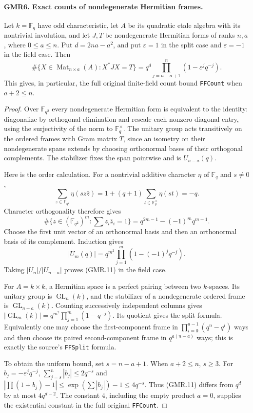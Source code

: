 \documentclass[11pt,a4paper]{article}
\numberwithin{equation}{section}
\theoremstyle{remark}\newtheorem{remark}[theorem]{Remark}
\begin{document}
\paragraph{GMR6. Exact counts of nondegenerate Hermitian frames.}
\label{claim:GMR6}
Let $k=\mathbb F_q$ have odd characteristic, let $A$ be its quadratic
etale algebra with its nontrivial involution, and let $J,T$ be
nondegenerate Hermitian forms of ranks $n,a$, where $0\leq a\leq n$.
Put $d=2na-a^2$, and put $\varepsilon=1$ in the split case and
$\varepsilon=-1$ in the field case.  Then
\[
 \#\{X\in\operatorname{Mat}_{n\times a}(A):X^*JX=T\}
  =q^d\prod_{j=n-a+1}^{n}(1-\varepsilon^j q^{-j}).
 \tag{GMR.11}
\]
This gives, in particular, the full original finite-field count bound
\texttt{FFCount} when $a+2\leq n$.

\begin{proof}
Over $\mathbb F_{q^2}$ every nondegenerate Hermitian form is equivalent
to the identity: diagonalize by orthogonal elimination and rescale
each nonzero diagonal entry, using the surjectivity of the norm to
$\mathbb F_q^\times$.  The unitary group acts transitively on the
ordered frames with Gram matrix $T$, since an isometry on their
nondegenerate spans extends by choosing orthonormal bases of their
orthogonal complements.  The stabilizer fixes the span pointwise and
is $U_{n-a}(q)$.

Here is the order calculation.  For a nontrivial additive character
$\eta$ of $\mathbb F_q$ and $s\ne0$,
\[
 \sum_{z\in\mathbb F_{q^2}}\eta(s z\bar z)
   =1+(q+1)\sum_{t\in\mathbb F_q^\times}\eta(st)=-q.
\]
Character orthogonality therefore gives
\[
 \#\{z\in(\mathbb F_{q^2})^m:\textstyle\sum z_i\bar z_i=1\}
  =q^{2m-1}-(-1)^m q^{m-1}.
\]
Choose the first unit vector of an orthonormal basis and then an
orthonormal basis of its complement.  Induction gives
\[
 |U_m(q)|=q^{m^2}\prod_{j=1}^{m}(1-(-1)^j q^{-j}).
 \tag{GMR.12}
\]
Taking $|U_n|/|U_{n-a}|$ proves (GMR.11) in the field case.

For $A=k\times k$, a Hermitian space is a perfect pairing between two
$k$-spaces.  Its unitary group is $\operatorname{GL}_n(k)$, and the
stabilizer of a nondegenerate ordered frame is
$\operatorname{GL}_{n-a}(k)$.  Counting successively independent
columns gives $|\operatorname{GL}_m(k)|=q^{m^2}\prod_{j=1}^m(1-q^{-j})$.
Its quotient gives the split formula.  Equivalently one may choose
the first-component frame in $\prod_{i=0}^{a-1}(q^n-q^i)$ ways and
then choose its paired second-component frame in $q^{a(n-a)}$ ways;
this is exactly the source's \texttt{FFSplit} formula.

To obtain the uniform bound, set $s=n-a+1$.  When $a+2\leq n$, $s\geq3$.
For $b_j=-\varepsilon^j q^{-j}$,
$\sum_{j=s}^n|b_j|\leq2q^{-s}$ and
$|\prod(1+b_j)-1|\leq\exp(\sum|b_j|)-1\leq4q^{-s}$.
Thus (GMR.11) differs from $q^d$ by at most $4q^{d-2}$.
The constant $4$, including the empty product $a=0$, supplies the
existential constant in the full original \texttt{FFCount}.
\end{proof}
\end{document}
